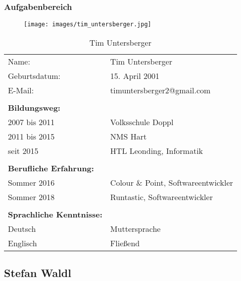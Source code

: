 \subsubsection*{Aufgabenbereich}
\begin{figure}[H]
	\texttt{[image: images/tim\_untersberger.jpg]}
\end{figure}
\begin{table}[htb]
\begin{tabular}{ll}
Name:                            & Tim Untersberger          \\
Geburtsdatum:                    & 15. April 2001                   \\
E-Mail:                          & timuntersberger2@gmail.com          \\
                                 &                               \\
\textbf{Bildungsweg:}            &                               \\  
2007 bis 2011                    & Volksschule Doppl          \\
2011 bis 2015                    & NMS Hart     \\
seit 2015                        & HTL Leonding, Informatik      \\
                                 &                               \\
\textbf{Berufliche Erfahrung:}   &                               \\
Sommer 2016                      & {Colour \& Point}, Softwareentwickler \\
Sommer 2018                      & Runtastic, Softwareentwickler \\
                                 &                               \\
\textbf{Sprachliche Kenntnisse:} &                               \\
Deutsch                          & Muttersprache                 \\
Englisch                         & Fließend                     
\end{tabular}
\caption{Tim Untersberger}
\end{table}
\pagebreak
\subsection*{Stefan Waldl}
